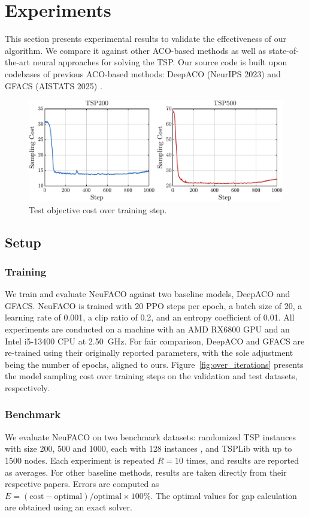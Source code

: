 \documentclass[a4paper,conference]{IEEEtran}
\begin{document}
\section{Experiments}
\hypersetup{citecolor=blue}
This section presents experimental results to validate the effectiveness of our algorithm. We compare it against other ACO-based methods as well as state-of-the-art neural approaches for solving the TSP. Our source code is built upon codebases of previous ACO-based methods: DeepACO (NeurIPS 2023) \cite{DeepACO} and GFACS (AISTATS 2025) \cite{GFACS}.

\begin{figure}[H]
  \centering
  \includegraphics[width=\linewidth]{TSP200_TSP500_Test.pdf}
  \caption{Test objective cost over training step.}
  \label{fig:val}
\end{figure}

\subsection{Setup}

\subsubsection{Training}
We train and evaluate NeuFACO against two baseline models, DeepACO and GFACS. NeuFACO is trained with 20 PPO steps per epoch, a batch size of 20, a learning rate of 0.001, a clip ratio of 0.2, and an entropy coefficient of 0.01. All experiments are conducted on a machine with an AMD RX6800 GPU and an Intel i5-13400 CPU at \SI{2.50}{GHz}. For fair comparison, DeepACO and GFACS are re-trained using their originally reported parameters, with the sole adjustment being the number of epochs, aligned to ours. Figure~\ref{fig:over_iterations} presents the model sampling cost over training steps on the validation and test datasets, respectively.

\subsubsection{Benchmark}
We evaluate NeuFACO on two benchmark datasets: randomized TSP instances with size 200, 500 and 1000, each with 128 instances \cite{DeepACO}, and TSPLib \cite{tsplib} with up to 1500 nodes. Each experiment is repeated $R=10$ times, and results are reported as averages. For other baseline methods, results are taken directly from their respective papers. Errors are computed as $E=(\text{cost}-\text{optimal}) / \text{optimal}\times100\%$. The optimal values for gap calculation are obtained using an exact solver.
\end{document}
